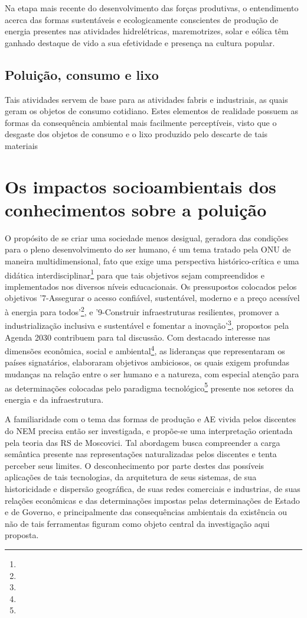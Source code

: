 \documentclass[
  12pt,       %
  openright,      %
  twoside,      %
  a4paper,      %
  english,      %
  french,       %
  spanish,      %
  brazil        %
  ]{abntex2}
\begin{document}
Na etapa mais recente do desenvolvimento das forças produtivas, o entendimento acerca das formas sustentáveis e ecologicamente conscientes de produção de energia presentes nas atividades hidrelétricas, maremotrizes, solar e eólica têm ganhado destaque de vido a sua efetividade e presença na cultura popular.


\subsection{Poluição, consumo e lixo}

Tais atividades servem de base para as atividades fabris e industriais, as quais geram os objetos de consumo cotidiano. Estes elementos de realidade possuem as formas da consequência ambiental mais facilmente perceptíveis, visto que o desgaste dos objetos de consumo e o lixo produzido pelo descarte de tais materiais


\section{Os impactos socioambientais dos conhecimentos sobre a poluição}

O propósito de se criar uma sociedade menos desigual, geradora das condições para o pleno desenvolvimento do ser humano, é um tema tratado pela ONU de maneira multidimensional, fato que exige uma perspectiva histórico-crítica e uma didática interdisciplinar\footnote{} para que tais objetivos sejam compreendidos e implementados nos diversos níveis educacionais. Os pressupostos colocados pelos objetivos '7-Assegurar o acesso confiável, sustentável, moderno e a preço
acessível à energia para todos'\footnote{}, e '9-Construir infraestruturas resilientes, promover a industrialização inclusiva e sustentável e fomentar a inovação'\footnote{}, propostos pela Agenda 2030 contribuem para tal discussão. Com destacado interesse nas dimensões econômica, social e ambiental\footnote{}, as lideranças que representaram os países signatários, elaboraram objetivos ambiciosos, os quais exigem profundas mudanças na relação entre o ser humano e a natureza, com especial atenção para as determinações colocadas pelo paradigma tecnológico\footnote{} presente nos setores da energia e da infraestrutura.

A familiaridade com o tema das formas de produção e AE vivida pelos discentes do NEM precisa então ser investigada, e propõe-se uma interpretação orientada pela teoria das RS de Moscovici. Tal abordagem busca compreender a carga semântica presente nas representações naturalizadas pelos discentes e tenta perceber seus limites. O desconhecimento por parte destes das possíveis aplicações de tais tecnologias, da arquitetura de seus sistemas, de sua historicidade e dispersão geográfica, de suas redes comerciais e industrias, de suas relações econômicas e das determinações impostas pelas determinações de Estado e de Governo, e principalmente das consequências ambientais da existência ou não de tais ferramentas figuram como objeto central da investigação aqui proposta.
\end{document}

